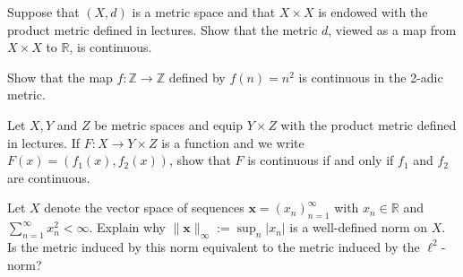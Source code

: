 \documentclass[answers]{exam}
\begin{document}
\begin{questions}
\question%
Suppose that $(X, d)$ is a metric space and that $X \times X$ is endowed with the product metric defined in lectures. Show that the metric $d$, viewed as a map from $X \times X$ to $\mathbb{R}$, is continuous.



\question%
Show that the map $f:\mathbb Z\to\mathbb Z$ defined by $f(n)=n^2$ is continuous in the 2-adic metric.



\question%
Let $X, Y$ and $Z$ be metric spaces and equip $Y \times Z$ with the product metric defined in lectures. If $F: X \to Y \times Z$ is a function and we write $F(x)=\left(f_{1}(x), f_{2}(x)\right)$, show that $F$ is continuous if and only if $f_{1}$ and $f_{2}$ are continuous.



\question%
Let $X$ denote the vector space of sequences $\mathbf{x}=\left(x_{n}\right)_{n=1}^{\infty}$ with $x_{n} \in \mathbb{R}$ and $\sum_{n=1}^{\infty} x_{n}^{2}<\infty$. Explain why $\|\mathbf{x}\|_{\infty}:=\sup _{n}\left|x_{n}\right|$ is a well-defined norm on $X$. Is the metric induced by this norm equivalent to the metric induced by the $\ell^{2}$-norm?

\end{questions}
\end{document}

